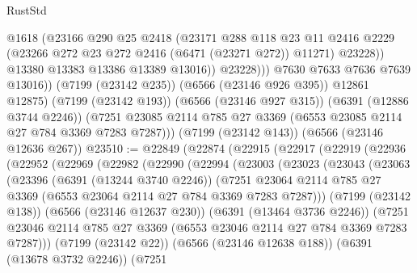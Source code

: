 \begin{lexlean}{RustStd}
\begin{coremodule}
                      @1618
                      (@23166
                        @290
                        @25
                        @2418
                        (@23171
                          @288
                          @118
                          @23
                          @11
                          @2416
                          @2229
                          (@23266 @272 @23 @272 @2416 (@6471 (@23271 @272)) @11271)
                          @23228))
                      @13380
                      @13383
                      @13386
                      @13389
                      @13016))
                  @23228)))
            @7630
            @7633
            @7636
            @7639
            @13016))
        (@7199 (@23142 @235))
        (@6566 (@23146 @926 @395))
        @12861
        @12875)
      (@7199 (@23142 @193))
      (@6566 (@23146 @927 @315))
      (@6391 (@12886 @3744 @2246))
      (@7251 @23085 @2114 @785 @27 @3369 (@6553 @23085 @2114 @27 @784 @3369 @7283 @7287)))
    (@7199 (@23142 @143))
    (@6566 (@23146 @12636 @267))
@23510 := @22849
    (@22874
      (@22915
        (@22917
          (@22919
            (@22936
              (@22952
                (@22969
                  (@22982
                    (@22990
                      (@22994
                        (@23003
                          (@23023
                            (@23043
                              (@23063
                                (@23396
                                  (@6391 (@13244 @3740 @2246))
                                  (@7251
                                    @23064
                                    @2114
                                    @785
                                    @27
                                    @3369
                                    (@6553 @23064 @2114 @27 @784 @3369 @7283 @7287)))
                                (@7199 (@23142 @138))
                                (@6566 (@23146 @12637 @230))
                                (@6391 (@13464 @3736 @2246))
                                (@7251
                                  @23046
                                  @2114
                                  @785
                                  @27
                                  @3369
                                  (@6553 @23046 @2114 @27 @784 @3369 @7283 @7287)))
                              (@7199 (@23142 @22))
                              (@6566 (@23146 @12638 @188))
                              (@6391 (@13678 @3732 @2246))
                              (@7251

\end{coremodule}
\end{lexlean}
